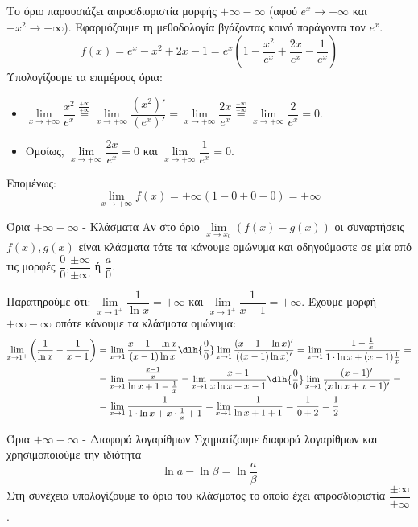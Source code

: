 \lysh
Το όριο παρουσιάζει απροσδιοριστία μορφής $+\infty - \infty$ (αφού $e^x \to +\infty$ και $-x^2 \to -\infty$). Εφαρμόζουμε τη μεθοδολογία βγάζοντας κοινό παράγοντα τον  $e^x$.
\[ 
f(x) = e^x - x^2 + 2x - 1 = e^x \left( 1 - \dfrac{x^2}{e^x} + \dfrac{2x}{e^x} - \dfrac{1}{e^x} \right)
\]
Υπολογίζουμε τα επιμέρους όρια:
\begin{itemize}
    \item $\displaystyle \lim\limits_{x\to +\infty} \dfrac{x^2}{e^x} \stackrel{\frac{+\infty}{+\infty}}{=} \lim\limits_{x\to +\infty} \dfrac{(x^2)'}{(e^x)'} = \lim\limits_{x\to +\infty} \dfrac{2x}{e^x} \stackrel{\frac{+\infty}{+\infty}}{=} \lim\limits_{x\to +\infty} \dfrac{2}{e^x} = 0$.
    \item Ομοίως, $\displaystyle \lim\limits_{x\to +\infty} \dfrac{2x}{e^x} = 0$ και $\displaystyle \lim\limits_{x\to +\infty} \dfrac{1}{e^x} = 0$.
\end{itemize}
Επομένως:
\[ 
\lim\limits_{x\to +\infty} f(x) = +\infty \left( 1 - 0 + 0 - 0 \right)= +\infty 
\]
\begin{askhsh}{Όρια $ +\infty-\infty $ - Κλάσματα}
Αν στο όριο $\lim\limits_{x\to x_0}{(f(x)-g(x))}$ οι συναρτήσεις $ f(x),g(x) $ είναι κλάσματα τότε τα κάνουμε ομώνυμα και οδηγούμαστε σε μία από τις μορφές $\dfrac{0}{0}$,$\dfrac{\pm\infty}{\pm\infty}$ ή $\dfrac{a}{0}$.
\end{askhsh}
\lysh
Παρατηρούμε ότι: $\displaystyle \lim\limits_{x\to 1^+} \dfrac{1}{\ln x} = +\infty$  και $\displaystyle \lim\limits_{x\to 1^+} \dfrac{1}{x-1} = +\infty$.
Έχουμε μορφή $+\infty - \infty$ οπότε κάνουμε τα κλάσματα ομώνυμα:
\begin{align*}
\lim\limits_{x\to 1^+} \left( \frac{1}{\ln x} - \frac{1}{x-1} \right)&=\lim\limits_{x\to 1} \frac{x-1-\ln x}{(x-1)\ln x}\dlh{\frac{0}{0}}\lim\limits_{x\to 1} \frac{(x-1-\ln x)'}{((x-1)\ln x)'} = \lim\limits_{x\to 1} \frac{1 - \frac{1}{x}}{1\cdot \ln x + (x-1)\frac{1}{x}} =\\&= \lim\limits_{x\to 1} \dfrac{\frac{x-1}{x}}{\ln x + 1 - \frac{1}{x}} = \lim\limits_{x\to 1} \frac{x-1}{x\ln x + x - 1}\dlh{\frac{0}{0}}\lim\limits_{x\to 1} \frac{(x-1)'}{(x\ln x + x - 1)'} =\\&= \lim\limits_{x\to 1} \frac{1}{1\cdot \ln x + x\cdot \frac{1}{x} + 1} = \lim\limits_{x\to 1} \frac{1}{\ln x + 1 + 1} = \frac{1}{0 + 2} = \frac{1}{2}
\end{align*}
\begin{askhsh}{Όρια $ +\infty-\infty $ - Διαφορά λογαρίθμων}
Σχηματίζουμε διαφορά λογαρίθμων και χρησιμοποιούμε την ιδιότητα
\[ \ln{a}-\ln{\beta}=\ln{\dfrac{a}{\beta}} \]
Στη συνέχεια υπολογίζουμε το όριο του κλάσματος το οποίο έχει απροσδιοριστία $\dfrac{\pm\infty}{\pm\infty}$.
\end{askhsh}

